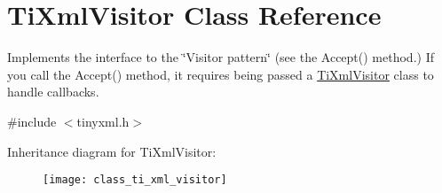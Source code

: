 \hypertarget{class_ti_xml_visitor}{
\section{TiXmlVisitor Class Reference}
\label{class_ti_xml_visitor}
}


Implements the interface to the \char`\"{}Visitor pattern\char`\"{} (see the Accept() method.) If you call the Accept() method, it requires being passed a \hyperlink{class_ti_xml_visitor}{TiXmlVisitor} class to handle callbacks.  




{\ttfamily \#include $<$tinyxml.h$>$}

Inheritance diagram for TiXmlVisitor:\begin{figure}[H]
\begin{center}
\leavevmode
\texttt{[image: class\_ti\_xml\_visitor]}
\end{center}
\end{figure}
